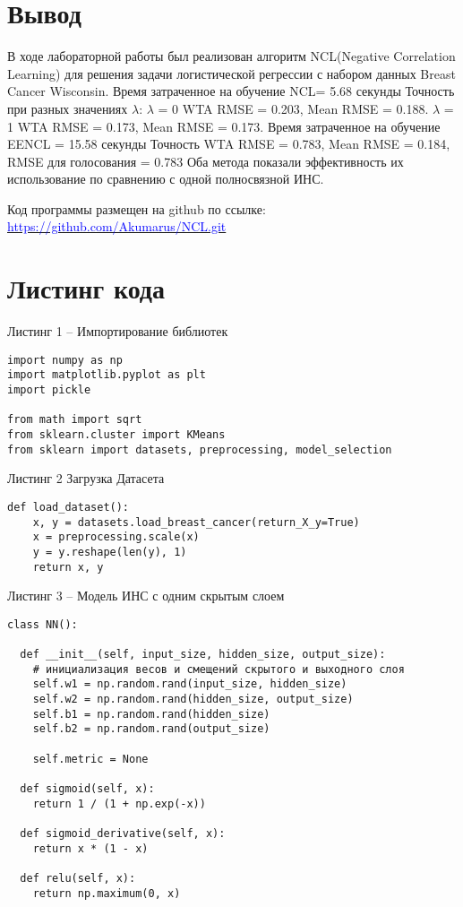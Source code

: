 \documentclass[12pt]{extarticle}
\begin{document}
\newpage %

\section{Вывод}
В ходе лабораторной работы был реализован алгоритм NCL(Negative Correlation Learning) для решения задачи логистической регрессии с набором данных Breast Cancer Wisconsin. Время затраченное на обучение  NCL= 5.68 секунды  Точность при разных значениях \(\lambda\):  \(\lambda\) = 0 WTA RMSE = 0.203, Mean RMSE = 0.188. \(\lambda\) = 1 WTA RMSE = 0.173, Mean RMSE = 0.173. Время затраченное на обучение EENCL = 15.58 секунды  Точность WTA RMSE = 0.783, Mean RMSE = 0.184, RMSE для голосования = 0.783 Оба метода показали эффективность их использование по сравнению с одной полносвязной ИНС.

Код программы размещен на github по ссылке: \href{https://github.com/Akumarus/NCL.git}{\textcolor{blue}{https://github.com/Akumarus/NCL.git}}

\newpage %

\section{Листинг кода}

Листинг 1 -- Импортирование библиотек

\begin{lstlisting}
import numpy as np
import matplotlib.pyplot as plt
import pickle

from math import sqrt
from sklearn.cluster import KMeans
from sklearn import datasets, preprocessing, model_selection
\end{lstlisting}

Листинг 2 Загрузка Датасета

\begin{lstlisting}
def load_dataset():
    x, y = datasets.load_breast_cancer(return_X_y=True)
    x = preprocessing.scale(x)
    y = y.reshape(len(y), 1)
    return x, y
\end{lstlisting}



Листинг 3 -- Модель ИНС с одним скрытым слоем

\begin{lstlisting}
class NN():

  def __init__(self, input_size, hidden_size, output_size):
    # инициализация весов и смещений скрытого и выходного слоя
    self.w1 = np.random.rand(input_size, hidden_size)
    self.w2 = np.random.rand(hidden_size, output_size)
    self.b1 = np.random.rand(hidden_size)
    self.b2 = np.random.rand(output_size)

    self.metric = None

  def sigmoid(self, x):
    return 1 / (1 + np.exp(-x))

  def sigmoid_derivative(self, x):
    return x * (1 - x)

  def relu(self, x):
    return np.maximum(0, x)
\end{lstlisting}
\end{document}
